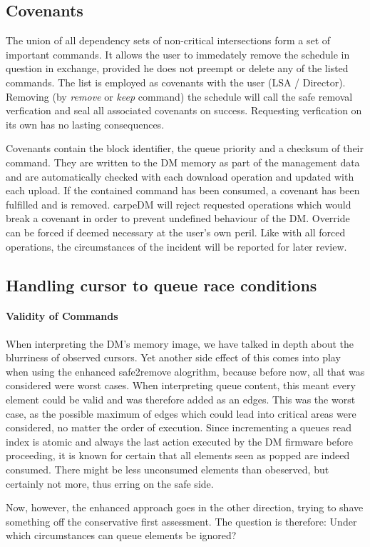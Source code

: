 \subsection{Covenants}
\label{ssec:cov}
The union of all dependency sets of non-critical intersections form a set of important commands. It allows the user to immedately remove the schedule in question in exchange, provided he does not preempt or delete any of the listed commands. The list is employed as covenants with the user (LSA / Director).
Removing (by \emph{remove} or \emph{keep} command) the schedule will call the safe removal verfication and seal all associated covenants on success. Requesting verfication on its own has no lasting consequences.
\par
Covenants contain the block identifier, the queue priority and a checksum of their command. They are written to the DM memory as part of the management data and are automatically checked with each download operation and updated with each upload. If the contained command has been consumed, a covenant has been fulfilled and is removed. carpeDM will reject requested operations which would break a covenant in order to prevent undefined behaviour of the DM. Override can be forced if deemed necessary at the user's own peril. Like with all forced operations, the circumstances of the incident will be reported for later review.

\subsection{Handling cursor to queue race conditions}
\paragraph{Validity of Commands}
When interpreting the DM's memory image, we have talked in depth about the blurriness of observed cursors. Yet another side effect of this comes into play when using the enhanced safe2remove alogrithm,
because before now, all that was considered were worst cases. When interpreting queue content, this meant every element could be valid and was therefore added as an edges. This was the worst case, as the possible maximum of edges which could lead into critical areas were considered, no matter the order of execution. Since incrementing a queues read index is atomic and always the last action executed by the DM firmware before proceeding,
it is known for certain that all elements seen as popped are indeed consumed. There might be less unconsumed elements than obeserved, but certainly not more, thus erring on the safe side.
\par Now, however, the enhanced approach goes in the other direction, trying to shave something off the conservative first assessment. The question is therefore: Under which circumstances can queue elements be ignored?


